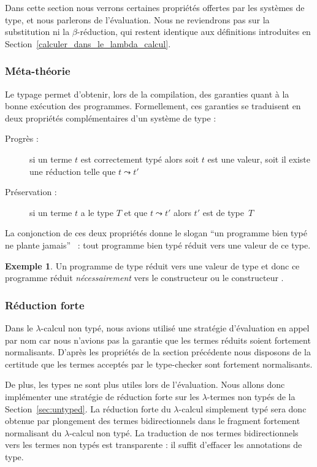 \documentclass {article}
\theoremstyle{definition}
\newtheorem{example}{Exemple}
\theoremstyle{remark}
\begin{document}
Dans cette section nous verrons certaines propriétés offertes par les
systèmes de type, et nous parlerons de l'évaluation. Nous ne
reviendrons pas sur la substitution ni la $\beta$-réduction, qui
restent identique aux définitions introduites en
Section~\ref{calculer_dans_le_lambda_calcul}.

\subsubsection{Méta-théorie}
\label{meta_theorie}

Le typage permet d'obtenir, lors de la compilation, des garanties quant à la
bonne exécution des programmes.  Formellement, ces garanties se traduisent en deux propriétés complémentaires d'un système de type :
\begin{description}
\item[Progrès :] si un terme \(t\) est correctement typé alors soit \(t\) est une valeur, soit il
 existe une réduction telle que \(t \leadsto t'\)
\item[Préservation :] si un terme $t$ a le type $T$
et que $t \leadsto t'$ alors $t'$ est de type~$T$
\end{description}

La conjonction de ces deux propriétés donne le slogan ``un programme
bien typé ne plante jamais''~\citep{milner:no-wrong} : tout programme
bien typé réduit vers une valeur de ce type.

\begin{example}
  Un programme de type \bool{} réduit vers une valeur de type \bool{}
  et donc ce programme réduit \emph{nécessairement} vers le
  constructeur \true{} ou le constructeur \false{}.
\end{example}


\subsubsection{Réduction forte}

\label{reduction_forte}
Dans le \(\lambda\)-calcul non typé, nous avions utilisé une stratégie
d'évaluation en appel par nom car nous n'avions pas la garantie que
les termes réduits soient fortement normalisants.  D'après les
propriétés de la section précédente nous disposons de la certitude que
les termes acceptés par le type-checker sont fortement
normalisants.

De plus, les types ne sont plus utiles lors de l'évaluation.  Nous
allons donc implémenter une stratégie de réduction forte sur les
\(\lambda\)-termes non typés de la Section~\ref{sec:untyped}. La
réduction forte du \(\lambda\)-calcul simplement typé sera donc
obtenue par plongement des termes bidirectionnels dans le fragment
fortement normalisant du \(\lambda\)-calcul non typé. La traduction de
nos termes bidirectionnels vers les termes non typés est transparente
: il suffit d'effacer les annotations de type.
\end{document}
